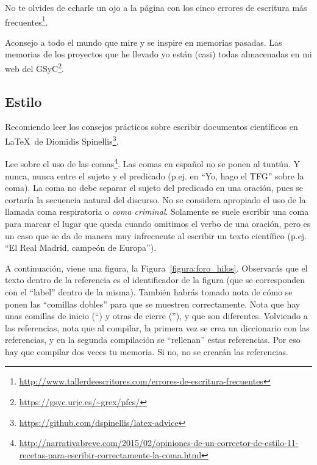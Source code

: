 \documentclass[a4paper, 12pt]{book}
\begin{document}
No te olvides de echarle un ojo a la página con los cinco errores de escritura más frecuentes\footnote{\url{http://www.tallerdeescritores.com/errores-de-escritura-frecuentes}}.

Aconsejo a todo el mundo que mire y se inspire en memorias pasadas.
Las memorias de los proyectos que he llevado yo están (casi) todas almacenadas en mi web del GSyC\footnote{\url{https://gsyc.urjc.es/~grex/pfcs/}}.

\subsection{Estilo}
\label{subsec:estilo}

Recomiendo leer los consejos prácticos sobre escribir documentos científicos en \LaTeX \ de Diomidis Spinellis\footnote{\url{https://github.com/dspinellis/latex-advice}}.

Lee sobre el uso de las comas\footnote{\url{http://narrativabreve.com/2015/02/opiniones-de-un-corrector-de-estilo-11-recetas-para-escribir-correctamente-la-coma.html}}. 
Las comas en español no se ponen al tuntún.
Y nunca, nunca entre el sujeto y el predicado (p.ej. en ``Yo, hago el TFG'' sobre la coma).
La coma no debe separar el sujeto del predicado en una oración, pues se cortaría la secuencia natural del discurso.
No se considera apropiado el uso de la llamada coma respiratoria o \emph{coma criminal}.
Solamente se suele escribir una coma para marcar el lugar que queda cuando omitimos el verbo de una oración, pero es un caso que se da de manera muy infrecuente al escribir un texto científico (p.ej. ``El Real Madrid, campeón de Europa'').

A continuación, viene una figura, la Figura~\ref{figura:foro_hilos}. 
Observarás que el texto dentro de la referencia es el identificador de la figura (que se corresponden con el ``label'' dentro de la misma). 
También habrás tomado nota de cómo se ponen las ``comillas dobles'' para que se muestren correctamente. 
Nota que hay unas comillas de inicio (``) y otras de cierre (''), y que son diferentes.
Volviendo a las referencias, nota que al compilar, la primera vez se crea un diccionario con las referencias, y en la segunda compilación se ``rellenan'' estas referencias. 
Por eso hay que compilar dos veces tu memoria.
Si no, no se crearán las referencias.
\end{document}

